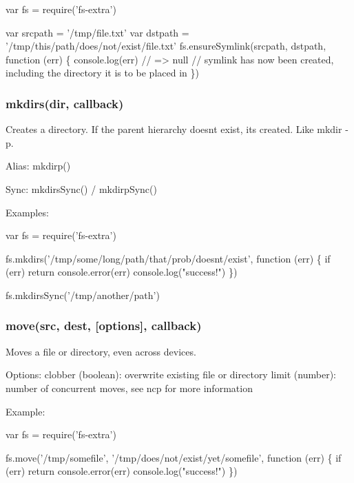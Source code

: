 \begin{DoxyCode}
var fs = require(\textcolor{stringliteral}{'fs-extra'})

var srcpath = '/tmp/file.txt'
var dstpath = '/tmp/this/path/does/not/exist/file.txt'
fs.ensureSymlink(srcpath, dstpath, function (err) \{
  console.log(err) \textcolor{comment}{// => null}
  \textcolor{comment}{// symlink has now been created, including the directory it is to be placed in}
\})
\end{DoxyCode}


\subsubsection*{mkdirs(dir, callback)}

Creates a directory. If the parent hierarchy doesn\textquotesingle{}t exist, it\textquotesingle{}s created. Like {\ttfamily mkdir -\/p}.

Alias\+: {\ttfamily mkdirp()}

Sync\+: {\ttfamily mkdirs\+Sync()} / {\ttfamily mkdirp\+Sync()}

Examples\+:


\begin{DoxyCode}
var fs = require(\textcolor{stringliteral}{'fs-extra'})

fs.mkdirs('/tmp/some/\textcolor{keywordtype}{long}/path/that/prob/doesnt/exist', function (err) \{
  \textcolor{keywordflow}{if} (err) \textcolor{keywordflow}{return} console.error(err)
  console.log(\textcolor{stringliteral}{"success!"})
\})

fs.mkdirsSync(\textcolor{stringliteral}{'/tmp/another/path'})
\end{DoxyCode}


\subsubsection*{move(src, dest, \mbox{[}options\mbox{]}, callback)}

Moves a file or directory, even across devices.

Options\+: clobber (boolean)\+: overwrite existing file or directory limit (number)\+: number of concurrent moves, see ncp for more information

Example\+:


\begin{DoxyCode}
var fs = require(\textcolor{stringliteral}{'fs-extra'})

fs.move('/tmp/somefile', '/tmp/does/not/exist/yet/somefile', function (err) \{
  \textcolor{keywordflow}{if} (err) \textcolor{keywordflow}{return} console.error(err)
  console.log(\textcolor{stringliteral}{"success!"})
\})
\end{DoxyCode}


